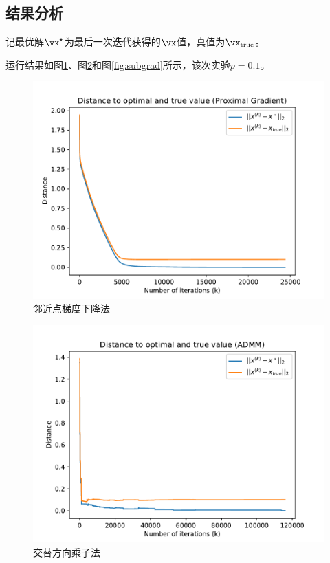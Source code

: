 \documentclass[logo,reportComp]{thesis}
\begin{document}
\subsection{结果分析}
记最优解$\vx^\star$为最后一次迭代获得的$\vx$值，真值为$\vx_{\text{true}}$。

运行结果如图\ref{fig:proxgrad}、图\ref{fig:admm}和图\ref{fig:subgrad}所示，该次实验$p=0.1$。

\begin{minipage}{0.5\linewidth}
\begin{figure}[H]
\centering
\includegraphics[width=\linewidth]{fig/proxgrad.pdf}
\caption{邻近点梯度下降法}
\label{fig:proxgrad}
\end{figure}
\end{minipage}
\begin{minipage}{0.5\linewidth}
\begin{figure}[H]
\centering
\includegraphics[width=\linewidth]{fig/admm.pdf}
\caption{交替方向乘子法}
\label{fig:admm}
\end{figure}
\end{minipage}
\end{document}
